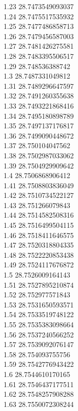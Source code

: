 {1.23	28.7473549093037\\
1.24	28.7475517535932\\
1.25	28.7477486858713\\
1.26	28.7479456587003\\
1.27	28.7481426275581\\
1.28	28.7483395506517\\
1.29	28.748536388742\\
1.3	28.7487331049812\\
1.31	28.7489296647597\\
1.32	28.7491260355638\\
1.33	28.7493221868416\\
1.34	28.7495180898789\\
1.35	28.7497137176817\\
1.36	28.7499090448672\\
1.37	28.750104047562\\
1.38	28.7502987033062\\
1.39	28.7504929909642\\
1.4	28.7506868906412\\
1.41	28.7508803836049\\
1.42	28.7510734522127\\
1.43	28.751266079843\\
1.44	28.7514582508316\\
1.45	28.7516499504115\\
1.46	28.7518411646575\\
1.47	28.7520318804335\\
1.48	28.7522220853438\\
1.49	28.7524117676872\\
1.5	28.7526009164143\\
1.51	28.7527895210874\\
1.52	28.752977571843\\
1.53	28.7531650593571\\
1.54	28.7533519748122\\
1.55	28.7535383098664\\
1.56	28.7537240566252\\
1.57	28.7539092076147\\
1.58	28.754093755756\\
1.59	28.7542776943422\\
1.6	28.7544610170165\\
1.61	28.7546437177511\\
1.62	28.7548257908288\\
1.63	28.7550072308244\\
}
